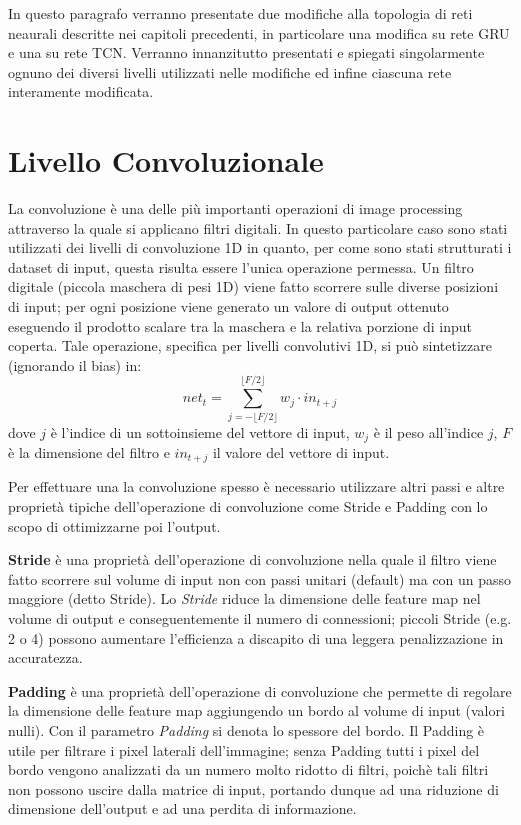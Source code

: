In questo paragrafo verranno presentate due modifiche alla topologia di reti neaurali descritte nei capitoli precedenti, in particolare una modifica su rete GRU e una su rete TCN. Verranno innanzitutto presentati e spiegati singolarmente ognuno dei diversi livelli utilizzati nelle modifiche ed infine ciascuna rete interamente modificata.


			


\section{Livello Convoluzionale}
La convoluzione è una delle più importanti operazioni di image processing attraverso la quale si applicano filtri digitali. In questo particolare caso sono stati utilizzati dei livelli di convoluzione 1D in quanto, per come sono stati strutturati i dataset di input, questa risulta essere l'unica operazione permessa.
Un filtro digitale (piccola maschera di pesi 1D) viene fatto scorrere sulle diverse posizioni di input; per ogni posizione viene generato un valore di output ottenuto eseguendo il prodotto scalare tra la maschera e la relativa porzione di input coperta. Tale operazione, specifica per livelli convolutivi 1D, si può sintetizzare (ignorando il bias) in:
\begin{equation}
	net_{t} = \sum_{j = -\lfloor F/2 \rfloor}^{\lfloor F/2 \rfloor}w_{j} \cdot in_{t+j}
\end{equation}
dove $j$ è l'indice di un sottoinsieme del vettore di input, $w_{j}$ è il peso all'indice $j$, $F$ è la dimensione del filtro e $in_{t+j}$ il valore del vettore di input.

Per effettuare una la convoluzione spesso è necessario utilizzare altri passi e altre proprietà tipiche dell'operazione di convoluzione come Stride e Padding con lo scopo di ottimizzarne poi l'output.

\textbf{Stride} è una proprietà dell'operazione di convoluzione nella quale il filtro viene fatto scorrere sul volume di input non con passi unitari (default) ma con un passo maggiore (detto Stride). Lo \textit{Stride} riduce la dimensione delle feature map nel volume di output e conseguentemente il numero di connessioni; piccoli Stride (e.g. 2 o 4) possono aumentare l'efficienza a discapito di una leggera penalizzazione in accuratezza.

\textbf{Padding} è una proprietà dell'operazione di convoluzione che permette di regolare la dimensione delle feature map aggiungendo un bordo al volume di input (valori nulli). Con il parametro \textit{Padding} si denota lo spessore del bordo. Il Padding è utile per filtrare i pixel laterali dell'immagine; senza Padding tutti i pixel del bordo vengono analizzati da un numero molto ridotto di filtri, poichè tali filtri non possono uscire dalla matrice di input, portando dunque ad una riduzione di dimensione dell'output e ad una perdita di informazione.

